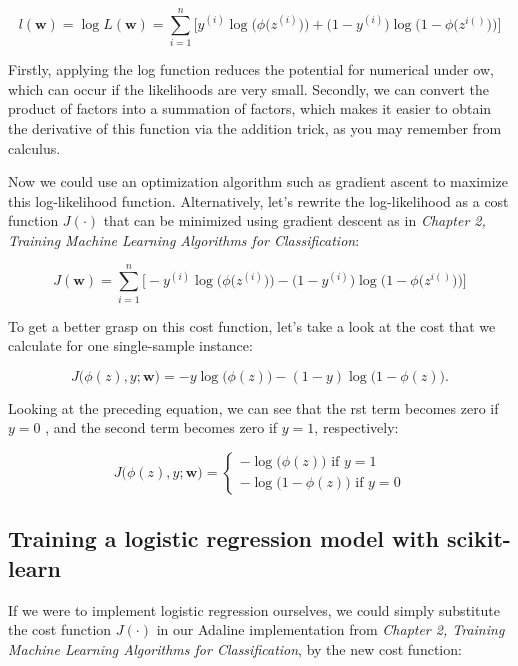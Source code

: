 \documentclass[letterpaper]{report}
\begin{document}
\[
l(\mathbf{w}) = \log L(\mathbf{w}) = \sum_{i=1}^{n} \Bigg[ y^{(i)} \log \bigg(\phi \big( z^{(i)} \big) \bigg) + \bigg(1 - y^{(i)} \bigg) \log \bigg( 1 - \phi \big( z^{i()} \big) \bigg)  \Bigg]
\]

Firstly, applying the log function reduces the potential for numerical under ow, which can occur if the likelihoods are very small. Secondly, we can convert the product of factors into a summation of factors, which makes it easier to obtain the derivative of this function via the addition trick, as you may remember
from calculus.

Now we could use an optimization algorithm such as gradient ascent to maximize this log-likelihood function. Alternatively, let's rewrite the log-likelihood as a cost function $J(\cdot)$ that can be minimized using gradient descent as in \textit{Chapter 2, Training Machine Learning Algorithms for Classification}:

\[
J(\mathbf{w}) = \sum_{i=1}^{n} \Bigg[- y^{(i)} \log \bigg(\phi \big( z^{(i)} \big) \bigg) - \bigg(1 - y^{(i)} \bigg) \log \bigg( 1 - \phi \big( z^{i()} \big) \bigg)  \Bigg]
\]

To get a better grasp on this cost function, let's take a look at the cost that we
calculate for one single-sample instance:

\[
J\big( \phi(z), y; \mathbf{w}   \big) = -y \log \big( \phi(z) \big) - (1-y) \log \big(1 - \phi(z) \big).
\]

Looking at the preceding equation, we can see that the  rst term becomes zero if
$y = 0$ , and the second term becomes zero if $y = 1$, respectively:


\[ 
J \big( \phi(z), y; \mathbf{w} \big)= \begin{cases} 
      - \log \big( \phi(z) \big) \text{ if } y=1\\
      - \log \big( 1 - \phi(z) \big)  \text{ if }  y=0
   \end{cases}
\]

\subsection{Training a logistic regression model with scikit-learn}

If we were to implement logistic regression ourselves, we could simply substitute the cost function $J(\cdot)$ in our Adaline implementation from \textit{Chapter 2, Training Machine Learning Algorithms for Classification}, by the new cost function:
\end{document}
